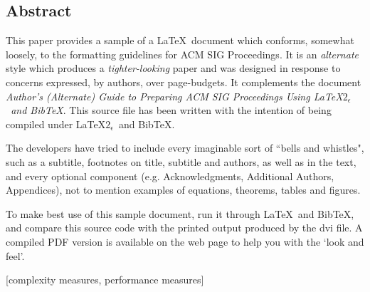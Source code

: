 
\subsection*{Abstract}
This paper provides a sample of a \LaTeX\ document which conforms, somewhat loosely, to the formatting guidelines for ACM SIG Proceedings. It is an {\em alternate} style which produces a {\em tighter-looking} paper and was designed in response to concerns expressed, by authors, over page-budgets. It complements the document \textit{Author's (Alternate) Guide to Preparing ACM SIG Proceedings Using \LaTeX$2_\epsilon$\ and Bib\TeX}. This source file has been written with the intention of being compiled under \LaTeX$2_\epsilon$\ and BibTeX.

The developers have tried to include every imaginable sort of ``bells and whistles", such as a subtitle, footnotes on title, subtitle and authors, as well as in the text, and every optional component (e.g. Acknowledgments, Additional Authors, Appendices), not to mention examples of equations, theorems, tables and figures. 

To make best use of this sample document, run it through \LaTeX\ and BibTeX, and compare this source code with the printed output produced by the dvi file. A compiled PDF version is available on the web page to help you with the `look and feel'. \cite{zheng2003empower, vahdat2002scalability}



[complexity measures, performance measures]


